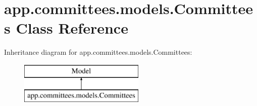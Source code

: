 \hypertarget{classapp_1_1committees_1_1models_1_1_committees}{}\section{app.\+committees.\+models.\+Committees Class Reference}
\label{classapp_1_1committees_1_1models_1_1_committees}
Inheritance diagram for app.\+committees.\+models.\+Committees\+:\begin{figure}[H]
\begin{center}
\leavevmode
\includegraphics[height=2.000000cm]{classapp_1_1committees_1_1models_1_1_committees}
\end{center}
\end{figure}
